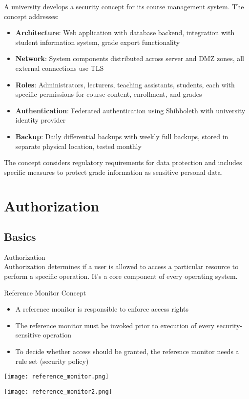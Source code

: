 \begin{example}
A university develops a security concept for its course management system. The concept addresses:

\begin{itemize}
    \item \textbf{Architecture}: Web application with database backend, integration with student information system, grade export functionality
    \item \textbf{Network}: System components distributed across server and DMZ zones, all external connections use TLS
    \item \textbf{Roles}: Administrators, lecturers, teaching assistants, students, each with specific permissions for course content, enrollment, and grades
    \item \textbf{Authentication}: Federated authentication using Shibboleth with university identity provider
    \item \textbf{Backup}: Daily differential backups with weekly full backups, stored in separate physical location, tested monthly
\end{itemize}

The concept considers regulatory requirements for data protection and includes specific measures to protect grade information as sensitive personal data.
\end{example}

\section{Authorization}

\subsection{Basics}

\begin{definition}{Authorization}\\
    Authorization determines if a user is allowed to access a particular resource to perform a specific operation. It's a core component of every operating system.
\end{definition}

\begin{concept}{Reference Monitor Concept}\\
    \begin{itemize}
        \item A reference monitor is responsible to enforce access rights
        \item The reference monitor must be invoked prior to execution of every security-sensitive operation
        \item To decide whether access should be granted, the reference monitor needs a rule set (security policy)
    \end{itemize}
    
    \texttt{[image: reference\_monitor.png]}

    \texttt{[image: reference\_monitor2.png]}
\end{concept}

